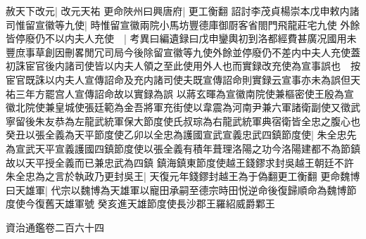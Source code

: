 赦天下改元|{
	改元天祐}
更命陜州曰興唐府|{
	更工衡翻}
詔討李茂貞楊崇本戊申敕内諸司惟留宣徽等九使|{
	時惟留宣徽兩院小馬坊豐德庫御㕑客省閤門飛龍莊宅九使}
外餘皆停廢仍不以内夫人充使　|{
	考異曰編遺録曰戊申鑾輿初到洛都經費甚廣况國用未豐庶事草創因刪畧閒冗司局今後除留宣徽等九使外餘並停廢仍不差内中夫人充使蓋初誅宦官後内諸司使皆以内夫人領之至此使用外人也而實録改充使為宣事誤也　按宦官既誅以内夫人宣傳詔命及充内諸司使夫既宣傳詔命則實録云宣事亦未為誤但天祐三年方罷宫人宣傳詔命故以實録為誤}
以蔣玄暉為宣徽南院使兼樞密使王殷為宣徽北院使兼皇城使張廷範為金吾將軍充街使以韋震為河南尹兼六軍諸衛副使又徵武寧留後朱友恭為左龍武統軍保大節度使氏叔琮為右龍武統軍典宿衛皆全忠之腹心也癸丑以張全義為天平節度使乙卯以全忠為護國宣武宣義忠武四鎮節度使|{
	朱全忠先為宣武天平宣義護國四鎮節度使以張全義有積年葺理洛陽之功今洛陽建都不為節鎮故以天平授全義而已兼忠武為四鎮}
鎮海鎮東節度使越王錢鏐求封吳越王朝廷不許朱全忠為之言於執政乃更封吳王|{
	天復元年錢鏐封越王為于偽翻更工衡翻}
更命魏博曰天雄軍|{
	代宗以魏博為天雄軍以寵田承嗣至德宗時田悦逆命後復歸順命為魏博節度使今復舊天雄軍號}
癸亥進天雄節度使長沙郡王羅紹威爵鄴王

資治通鑑卷二百六十四
